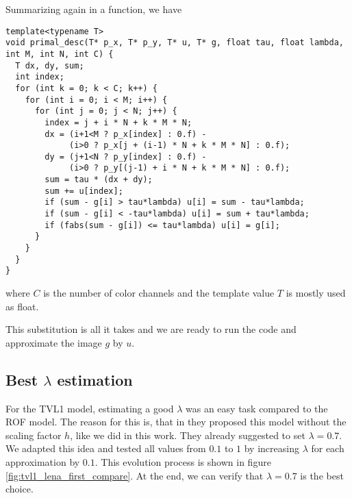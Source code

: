         \begin{algorithm}
            Summarizing again in a function, we have
            \begin{lstlisting}
template<typename T>
void primal_desc(T* p_x, T* p_y, T* u, T* g, float tau, float lambda, int M, int N, int C) {
  T dx, dy, sum;
  int index;
  for (int k = 0; k < C; k++) {
    for (int i = 0; i < M; i++) {
      for (int j = 0; j < N; j++) {
        index = j + i * N + k * M * N;
        dx = (i+1<M ? p_x[index] : 0.f) -
             (i>0 ? p_x[j + (i-1) * N + k * M * N] : 0.f);
        dy = (j+1<N ? p_y[index] : 0.f) -
             (i>0 ? p_y[(j-1) + i * N + k * M * N] : 0.f);
        sum = tau * (dx + dy);
        sum += u[index];
        if (sum - g[i] > tau*lambda) u[i] = sum - tau*lambda;
        if (sum - g[i] < -tau*lambda) u[i] = sum + tau*lambda;
        if (fabs(sum - g[i]) <= tau*lambda) u[i] = g[i];
      }
    }
  }
}
            \end{lstlisting}
            where $C$ is the number of color channels and the template value $T$ is mostly used as float.
        \end{algorithm}

        This substitution is all it takes and we are ready to run the code and approximate the image $g$ by $u$.

        \subsection{Best $\lambda$ estimation} %
        \label{sub:best_lambda_estimation_tvl1}

            For the TVL1 model, estimating a good $\lambda$ was an easy task compared to the ROF model. The reason for this is, that in \cite{Chambolle10afirst-order} they proposed this model without the scaling factor $h$, like we did in this work. They already suggested to set $\lambda = 0.7$. We adapted this idea and tested all values from $0.1$ to $1$ by increasing $\lambda$ for each approximation by $0.1$. This evolution process is shown in figure \ref{fig:tvl1_lena_first_compare}. At the end, we can verify that $\lambda = 0.7$ is the best choice.
            
